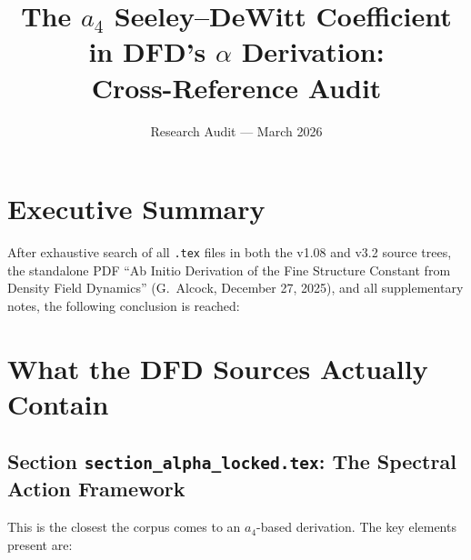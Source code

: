 \documentclass[11pt,a4paper]{article}
\title{The $a_4$ Seeley--DeWitt Coefficient in DFD's $\alpha$ Derivation:\\
Cross-Reference Audit}
\author{Research Audit --- March 2026}
\date{}
\begin{document}
\maketitle

\section{Executive Summary}

After exhaustive search of all \texttt{.tex} files in both the v1.08 and v3.2
source trees, the standalone PDF ``Ab Initio Derivation of the Fine Structure
Constant from Density Field Dynamics'' (G.~Alcock, December 27, 2025), and
all supplementary notes, the following conclusion is reached:

\begin{center}
\end{center}

\section{What the DFD Sources Actually Contain}

\subsection{Section \texttt{section\_alpha\_locked.tex}: The Spectral Action Framework}

This is the closest the corpus comes to an $a_4$-based derivation.  The key
elements present are:
\end{document}
